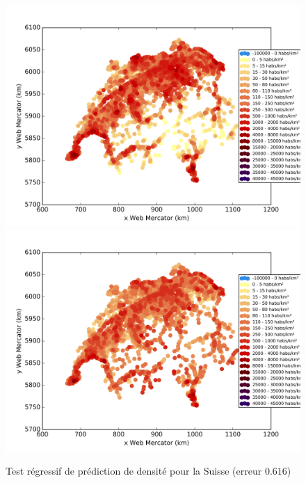 \documentclass{book}
\begin{document}
\begin{figure}[H]
\begin{center}
\includegraphics[scale=0.5]{images/suisse_ground_truth.png}
\includegraphics[scale=0.5]{images/suisse_Random_Forest_Regression.png}
\end{center}
\caption{Test régressif de prédiction de densité pour la Suisse (erreur $0.616$)}
\label{test_suisse}
\end{figure}

\backmatter

\listoftables

\listoffigures



\end{document}
